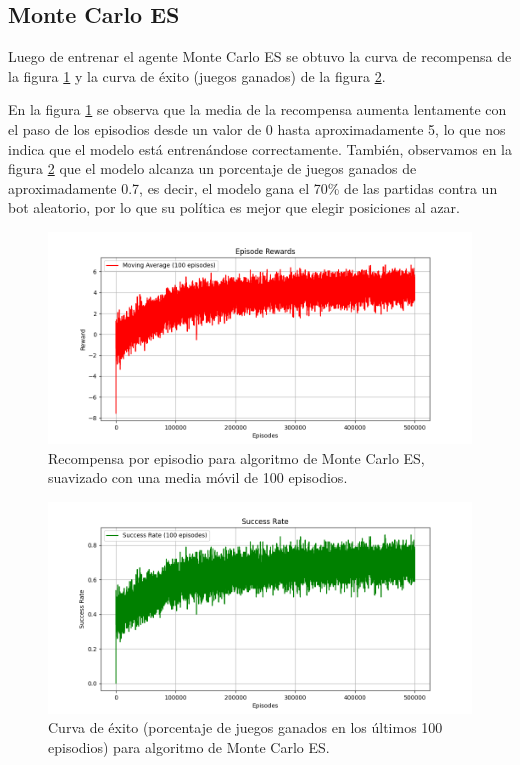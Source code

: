 \subsection{Monte Carlo ES}

Luego de entrenar el agente Monte Carlo ES se obtuvo la curva de recompensa de la figura \ref{fig:monte_carlo_episode_rewards}  y la curva de éxito (juegos ganados) de la figura \ref{fig:monte_carlo_success_rate}.

En la figura \ref{fig:monte_carlo_episode_rewards} se observa que la media de la recompensa aumenta lentamente con el paso de los episodios desde un valor de 0 hasta aproximadamente 5, lo que nos indica que el modelo está entrenándose correctamente. También, observamos en la figura \ref{fig:monte_carlo_success_rate} que el modelo alcanza un porcentaje de juegos ganados de aproximadamente 0.7, es decir, el modelo gana el 70\% de las partidas contra un bot aleatorio, por lo que su política es mejor que elegir posiciones al azar.

\clearpage

\begin{figure}[htbp]
	\centering
	\includegraphics[width=\textwidth]{./Figures/monte_carlo_episode_rewards.png}
	\caption{Recompensa por episodio para algoritmo de Monte Carlo ES, suavizado con una media móvil de 100 episodios.}
	\label{fig:monte_carlo_episode_rewards}
\end{figure}

\begin{figure}[htbp]
	\centering
	\includegraphics[width=\textwidth]{./Figures/monte_carlo_success_rate.png}
	\caption{Curva de éxito (porcentaje de juegos ganados en los últimos 100 episodios) para algoritmo de Monte Carlo ES.}
	\label{fig:monte_carlo_success_rate}
\end{figure}

